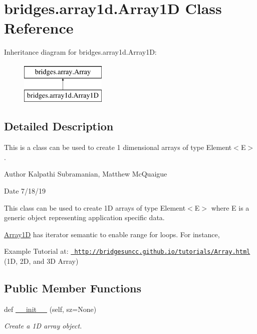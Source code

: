 \hypertarget{classbridges_1_1array1d_1_1_array1_d}{}\section{bridges.\+array1d.\+Array1D Class Reference}
\label{classbridges_1_1array1d_1_1_array1_d}
Inheritance diagram for bridges.\+array1d.\+Array1D\+:\begin{figure}[H]
\begin{center}
\leavevmode
\includegraphics[height=2.000000cm]{classbridges_1_1array1d_1_1_array1_d}
\end{center}
\end{figure}


\subsection{Detailed Description}
This is a class can be used to create 1 dimensional arrays of type Element$<$\+E$>$. 

\begin{DoxyAuthor}{Author}
Kalpathi Subramanian, Matthew Mc\+Quaigue
\end{DoxyAuthor}
\begin{DoxyDate}{Date}
7/18/19
\end{DoxyDate}
This class can be used to create 1D arrays of type Element$<$\+E$>$ where E is a generic object representing application specific data.

\mbox{\hyperlink{classbridges_1_1array1d_1_1_array1_d}{Array1D}} has iterator semantic to enable range for loops. For instance,


\begin{DoxyCode}{0}
\end{DoxyCode}


Example Tutorial at\+: \href{http://bridgesuncc.github.io/tutorials/Array.html}{\texttt{ http\+://bridgesuncc.\+github.\+io/tutorials/\+Array.\+html}} (1D, 2D, and 3D Array)~\newline
 \subsection*{Public Member Functions}
\begin{DoxyCompactItemize}
\item 
def \mbox{\hyperlink{classbridges_1_1array1d_1_1_array1_d_ac3bc432b5a53c890871a5884c08a6fa2}{\+\_\+\+\_\+init\+\_\+\+\_\+}} (self, sz=None)
\begin{DoxyCompactList}\small\item\em Create a 1D array object. \end{DoxyCompactList}\end{DoxyCompactItemize}
